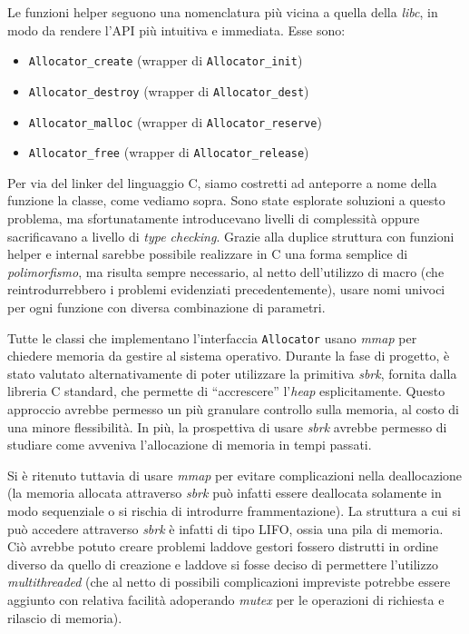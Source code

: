 Le funzioni helper seguono una nomenclatura più vicina a quella della \textit{libc}, in modo da rendere l’API più intuitiva e immediata. Esse sono:
\begin{itemize}
    \item \texttt{Allocator\_create} (wrapper di \texttt{Allocator\_init})
    \item \texttt{Allocator\_destroy} (wrapper di \texttt{Allocator\_dest})
    \item \texttt{Allocator\_malloc} (wrapper di \texttt{Allocator\_reserve})
    \item \texttt{Allocator\_free} (wrapper di \texttt{Allocator\_release})
\end{itemize}
Per via del linker del linguaggio C, siamo costretti ad anteporre a nome della funzione la classe, come vediamo sopra. Sono state esplorate soluzioni a questo problema, ma sfortunatamente introducevano livelli di complessità oppure sacrificavano a livello di \textit{type checking}. Grazie alla duplice struttura con funzioni helper e internal sarebbe possibile realizzare in C una forma semplice di \textit{polimorfismo}, ma risulta sempre necessario, al netto dell’utilizzo di macro (che reintrodurrebbero i problemi evidenziati precedentemente), usare nomi univoci per ogni funzione con diversa combinazione di parametri.

Tutte le classi che implementano l’interfaccia \texttt{Allocator} usano \textit{mmap} per chiedere memoria da gestire al sistema operativo. Durante la fase di progetto, è stato valutato alternativamente di poter utilizzare la primitiva \textit{sbrk}, fornita dalla libreria C standard, che permette di “accrescere” l’\textit{heap} esplicitamente. Questo approccio avrebbe permesso un più granulare controllo sulla memoria, al costo di una minore flessibilità. In più, la prospettiva di usare \textit{sbrk} avrebbe permesso di studiare come avveniva l’allocazione di memoria in tempi passati.

Si è ritenuto tuttavia di usare \textit{mmap} per evitare complicazioni nella deallocazione (la memoria allocata attraverso \textit{sbrk} può infatti essere deallocata solamente in modo sequenziale o si rischia di introdurre frammentazione). La struttura a cui si può accedere attraverso \textit{sbrk} è infatti di tipo LIFO, ossia una pila di memoria. Ciò avrebbe potuto creare problemi laddove gestori fossero distrutti in ordine diverso da quello di creazione e laddove si fosse deciso di permettere l’utilizzo \textit{multithreaded} (che al netto di possibili complicazioni impreviste potrebbe essere aggiunto con relativa facilità adoperando \textit{mutex} per le operazioni di richiesta e rilascio di memoria).

